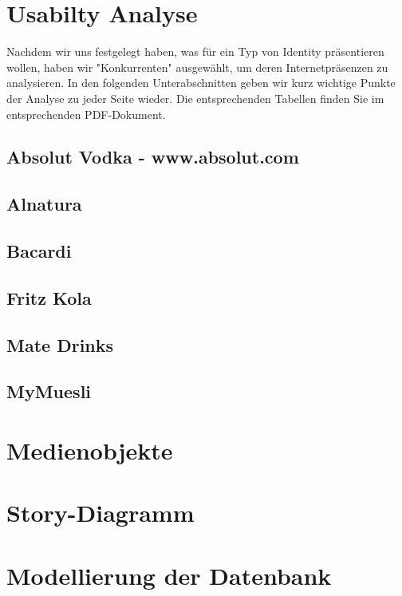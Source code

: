 \documentclass[12pt,a4paper,oneside,ngerman]{article}
\begin{document}
\newpage %
\section{Usabilty Analyse}
Nachdem wir uns festgelegt haben, was für ein Typ von Identity präsentieren wollen, haben wir "Konkurrenten" ausgewählt, um deren Internetpräsenzen zu analysieren. In den folgenden Unterabschnitten geben wir kurz wichtige Punkte der Analyse zu jeder Seite wieder. Die entsprechenden Tabellen finden Sie im entsprechenden PDF-Dokument.
\subsection{Absolut Vodka - www.absolut.com}

\subsection{Alnatura}

\subsection{Bacardi}

\subsection{Fritz Kola}

\subsection{Mate Drinks}

\subsection{MyMuesli}


\section{Medienobjekte}


\section{Story-Diagramm}



\section{Modellierung der Datenbank}
\end{document}
